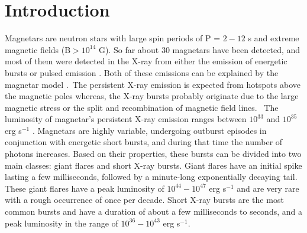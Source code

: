 \documentclass[twocolumn]{emulateapj}
\begin{document}
\section{Introduction}

Magnetars are neutron stars with large spin periods of P = $2-12$ s and extreme magnetic fields (B$> 10^{14}$ G). So far about 30 magnetars have been detected, and most of them were detected in the X-ray from either the emission of energetic bursts or pulsed emission \citep{kaspi2017}. Both of these emissions can be explained by the magnetar model \citep{duncan1992,paczynski92}. The persistent X-ray emission is expected from hotspots above the magnetic poles whereas, the X-ray bursts probably originate due to the large magnetic stress or the split and recombination of magnetic field lines. 
The luminosity of magnetar's persistent X-ray emission ranges between $10^{33}$ and $10^{35}$ erg s$^{-1}$ \citep{thompson2002,lyutikob2003}. Magnetars are highly variable, undergoing outburst episodes in conjunction with energetic short bursts, and during that time the number of photons increases. Based on their properties, these bursts can be divided into two main classes: giant flares \citep{palmer2005} and short X-ray bursts. Giant flares have an initial spike lasting a few milliseconds, followed by a minute-long exponentially decaying tail. These giant flares have a peak luminosity of $10^{44} - 10^{47}$ erg s$^{-1}$ and are very rare with a rough occurrence of once per decade. Short X-ray bursts are the most common bursts and have a duration of about a few milliseconds to seconds, and a peak luminosity in the range of $10^{36} - 10^{43}$ erg s$^{-1}$.%
 
\end{document}
